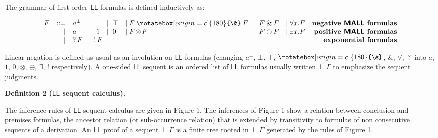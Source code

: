 \documentclass[10pt,a4paper]{article}
\newcommand{\binampersand}{\mathbin{\&}}
\newcommand{\bindnasrepma}{\mathbin{\rotatebox[origin=c]{180}{\&}}}
\begin{document}
The grammar of first-order $\mathsf{LL}$ formulas is defined inductively as:\par
    \[\begin{array}[]{lrlllllr}F&::=&a^{\perp}&\mid\leavevmode\nobreak\ \perp\leavevmode\nobreak\ \leavevmode\nobreak\ \leavevmode\nobreak\ \mid\leavevmode\nobreak\ \top&\mid F\bindnasrepma F&\mid F\binampersand F&\mid\forall x.F&\textbf{negative \boldmath$\mathsf{MALL}$ formulas}\\
&\mid&a&\mid\leavevmode\nobreak\ 1\leavevmode\nobreak\ \leavevmode\nobreak\ \mid\leavevmode\nobreak\ 0&\mid F\hskip-1.0pt\otimes\hskip-1.0ptF&\mid F\oplus
F&\mid\exists x.F&\textbf{positive \boldmath$\mathsf{MALL}$ formulas}\\
&\mid&\mathop{?}F&\mid\mathop{!}F&&&&\textbf{exponential formulas}\end{array}\]    
 
 
Linear negation is defined as usual as an involution on $\mathsf{LL}$ formulas (changing $a^{\perp}$, $\bot$, $\top$, $\bindnasrepma$, $\binampersand$, $\forall$, $\mathop{?}$ into $a$, $1$, $0$, $\hskip-1.0pt\otimes\hskip-1.0pt$, $\oplus$, $\exists$, $\mathop{!}$ respectively). A one-sided $\mathsf{LL}$ sequent is an ordered list of $\mathsf{LL}$ formulas usually written $\vdash\Gamma$ to emphasize the sequent judgments.\par
 
 
 
 
\par\medskip\noindent\textbf{Definition 2 ($\mathsf{LL}$ sequent calculus).}\par
 
 
The inference rules of $\mathsf{LL}$ sequent calculus are given in Figure 1. The inferences of Figure 1 show a relation between conclusion and premises formulas, the ancestor relation (or sub-occurrence relation) that is extended by transitivity to formulas of non consecutive sequents of a derivation. An $\mathsf{LL}$ proof of a sequent $\vdash\Gamma$ is a finite tree rooted in $\vdash\Gamma$ generated by the rules of Figure 1.\par
 
 
 
\end{document}
